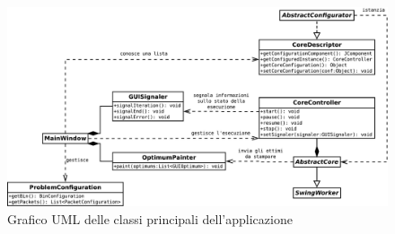 \begin{figure}[h!tp]
 \centering
 \includegraphics[width=\textwidth]{./img/uml_classi.pdf}
 \caption{Grafico UML delle classi principali dell'applicazione}
 \label{fig:uml_classi}
\end{figure}
